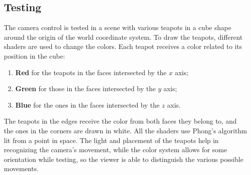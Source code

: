 \documentclass{acmtog}
\begin{document}
\subsection{Testing}

The camera control is tested in a scene with various teapots in a cube shape around the origin of the world coordinate system. To draw the teapots, different shaders are used to change the colors. Each teapot receives a color related to its position in the cube:
\begin{enumerate}
\item{\textbf{Red} for the teapots in the faces intersected by the $x$ axis;}
\item{\textbf{Green} for those in the faces intersected by the $y$ axis;}
\item{\textbf{Blue} for the ones in the faces intersected by the $z$ axis.}
\end{enumerate}
The teapots in the edges receive the color from both faces they belong to, and the ones in the corners are drawn in white. All the shaders use Phong's algorithm lit from a point in space. The light and placement of the teapots help in recognizing the camera's movement, while the color system allows for some orientation while testing, so the viewer is able to distinguish the various possible movements.
\end{document}
